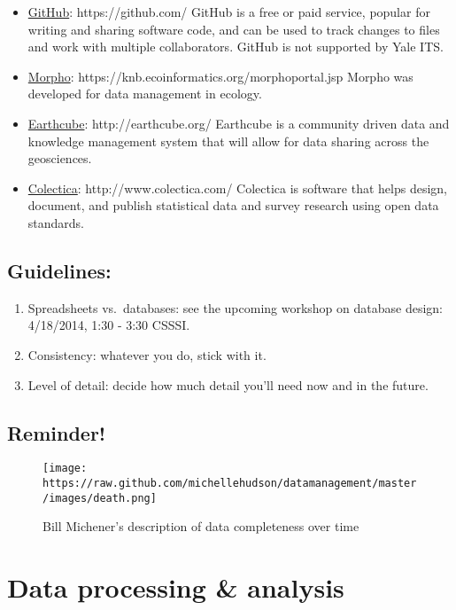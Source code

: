 \documentclass[]{article}
\begin{document}
\begin{itemize}
\item
  \href{https://github.com/}{GitHub}: https://github.com/ GitHub is a
  free or paid service, popular for writing and sharing software code,
  and can be used to track changes to files and work with multiple
  collaborators. GitHub is not supported by Yale ITS.
\item
  \href{https://knb.ecoinformatics.org/morphoportal.jsp}{Morpho}:
  https://knb.ecoinformatics.org/morphoportal.jsp Morpho was developed
  for data management in ecology.
\item
  \href{http://earthcube.org/}{Earthcube}: http://earthcube.org/
  Earthcube is a community driven data and knowledge management system
  that will allow for data sharing across the geosciences.
\item
  \href{http://www.colectica.com/}{Colectica}: http://www.colectica.com/
  Colectica is software that helps design, document, and publish
  statistical data and survey research using open data standards.
\end{itemize}

\subsection{Guidelines:}\label{guidelines}

\begin{enumerate}
\def\labelenumi{\arabic{enumi}.}
\itemsep1pt\parskip0pt
\item
  Spreadsheets vs.~databases: see the upcoming workshop on database
  design: 4/18/2014, 1:30 - 3:30 CSSSI.
\item
  Consistency: whatever you do, stick with it.
\item
  Level of detail: decide how much detail you'll need now and in the
  future.
\end{enumerate}

\subsection{Reminder!}\label{reminder}

\begin{figure}[htbp]
\centering
\texttt{[image: https://raw.github.com/michellehudson/datamanagement/master/images/death.png]}
\caption{Bill Michener's description of data completeness over time}
\end{figure}

\section{Data processing \& analysis}\label{data-processing-analysis}
\end{document}
